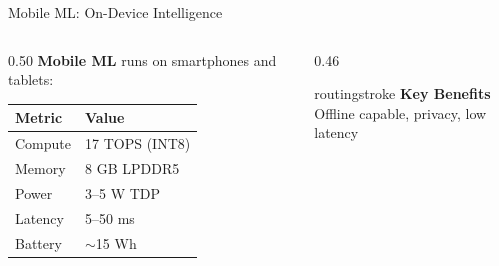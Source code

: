 \documentclass[aspectratio=169, 12pt]{beamer}
\begin{document}
\begin{frame}{Mobile ML: On-Device Intelligence}
\note{
%
%
%
%
}

\footnotesize
\begin{columns}[T]
  \begin{column}{0.50\textwidth}
    \textbf{Mobile ML} runs on smartphones and tablets:

    \vspace{0.1cm}
    \renewcommand{\arraystretch}{1.1}
    \begin{tabular}{@{}ll@{}}
      \toprule
      \textbf{Metric} & \textbf{Value} \\
      \midrule
      Compute    & 17 TOPS (INT8) \\
      Memory     & 8 GB LPDDR5 \\
      Power      & 3--5 W TDP \\
      Latency    & 5--50 ms \\
      Battery    & $\sim$15 Wh \\
      \bottomrule
    \end{tabular}

    \vspace{0.1cm}
  \end{column}
  \begin{column}{0.46\textwidth}
    \vspace{0.1cm}
    \begin{mlsyscard}{routingstroke}
    \textbf{Key Benefits}\\
    Offline capable, privacy, low latency
    \end{mlsyscard}


\end{column}
\end{columns}
\end{frame}
\end{document}
